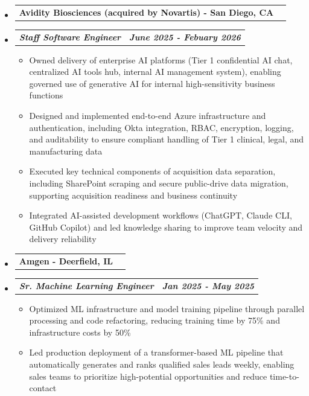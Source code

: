 \documentclass[letterpaper,11pt]{article}
\makeatletter
\newcommand{\resumeItem}[1]{
  \item\small{
    {#1 \vspace{0pt}}
  }
}
\newcommand{\resumeSubheading}[2]{
  \vspace{-1pt}\item
    \begin{tabular*}{0.97\textwidth}[t]{l@{\extracolsep{\fill}}r}
      \textbf{\small#1 - \small#2} 
    \end{tabular*}\vspace{-13pt}
}
\newcommand{\resumeSubSubheading}[2]{
    \item
    \vspace{2pt}
    \begin{tabular*}{0.97\textwidth}{l@{\extracolsep{\fill}}r}
      \textbf{\textit{\small#1}} & \textbf{\textit{\small#2}} \\
    \end{tabular*}\vspace{-5pt}
}
\newcommand{\resumeHeadingListStart}{\begin{itemize}[leftmargin=0.05in, label={}]}
\newcommand{\resumeHeadingListEnd}{\end{itemize}}
\newcommand{\resumeSubHeadingListStart}{\begin{itemize}[leftmargin=0.15in, label={}]}
\newcommand{\resumeSubHeadingListEnd}{\end{itemize}\vspace{-15pt}}
\newcommand{\resumeItemListStart}{\begin{itemize}[leftmargin=0.15in]}
\newcommand{\resumeItemListEnd}{\end{itemize}\vspace{-10pt}}
\makeatother
\begin{document}
    \resumeHeadingListStart
        \resumeSubheading{Avidity Biosciences (acquired by Novartis)}{San Diego, CA}
    \resumeHeadingListEnd
        \resumeSubHeadingListStart
            \resumeSubSubheading {Staff Software Engineer}{June 2025 - Febuary 2026}
            \resumeItemListStart
                \resumeItem{Owned delivery of enterprise AI platforms (Tier 1 confidential AI chat, centralized AI tools hub, internal AI management system), enabling governed use of generative AI for internal high-sensitivity business functions}
                \resumeItem{Designed and implemented end-to-end Azure infrastructure and authentication, including Okta integration, RBAC, encryption, logging, and auditability to ensure compliant handling of Tier 1 clinical, legal, and manufacturing data}
                \resumeItem{Executed key technical components of acquisition data separation, including SharePoint scraping and secure public-drive data migration, supporting acquisition readiness and business continuity}
                \resumeItem{Integrated AI-assisted development workflows (ChatGPT, Claude CLI, GitHub Copilot) and led knowledge sharing to improve team velocity and delivery reliability}
            \resumeItemListEnd
        \resumeSubHeadingListEnd

    \resumeHeadingListStart
        \resumeSubheading{Amgen}{Deerfield, IL}
    \resumeHeadingListEnd
        \resumeSubHeadingListStart
            \resumeSubSubheading {Sr. Machine Learning Engineer}{Jan 2025 - May 2025}
            \resumeItemListStart
                \resumeItem{Optimized ML infrastructure and model training pipeline through parallel processing and code refactoring, reducing training time by 75\% and infrastructure costs by 50\%}
                \resumeItem{Led production deployment of a transformer-based ML pipeline that automatically generates and ranks qualified sales leads weekly, enabling sales teams to prioritize high-potential opportunities and reduce time-to-contact}
                            
            \resumeItemListEnd
        \resumeSubHeadingListEnd
\end{document}

